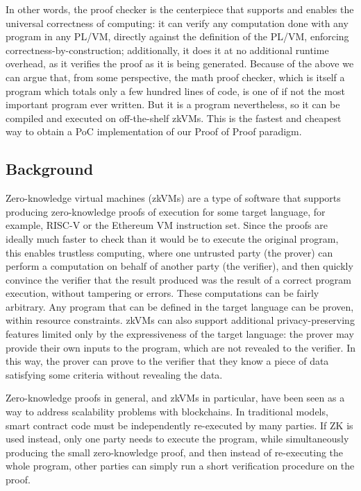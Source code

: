 \documentclass{article}
\theoremstyle{plain}
\theoremstyle{definition}
\begin{document}
In other words, the proof checker is the centerpiece that supports and enables the universal correctness of computing: it can verify any computation done with any program in any PL/VM, directly against the definition of the PL/VM, enforcing correctness-by-construction; additionally, it does it at no additional runtime overhead, as it verifies the proof as it is being generated.  Because of the above we can argue that, from some perspective, the math proof checker, which is itself a program which totals only a few hundred lines of code, is one of if not the most important program ever written.  But it is a program nevertheless, so it can be compiled and executed on off-the-shelf zkVMs. This is the fastest and cheapest way to obtain a PoC implementation of our Proof of Proof paradigm.

\subsection{Background}

Zero-knowledge virtual machines (zkVMs) are a type of software that supports producing zero-knowledge proofs of execution for some target language, for example, RISC-V or the Ethereum VM instruction set. Since the proofs are ideally much faster to check than it would be to execute the original program, this enables trustless computing, where one untrusted party (the prover) can perform a computation on behalf of another party (the verifier), and then quickly convince the verifier that the result produced was the result of a correct program execution, without tampering or errors. These computations can be fairly arbitrary. Any program that can be defined in the target language can be proven, within resource constraints. zkVMs can also support additional privacy-preserving features limited only by the expressiveness of the target language: the prover may provide their own inputs to the program, which are not revealed to the verifier. In this way, the prover can prove to the verifier that they know a piece of data satisfying some criteria without revealing the data. 

Zero-knowledge proofs in general, and zkVMs in particular, have been seen as a way to address scalability problems with blockchains. In traditional models, smart contract code must be independently re-executed by many parties. If ZK is used instead, only one party needs to execute the program, while simultaneously producing the small zero-knowledge proof, and then instead of re-executing the whole program, other parties can simply run a short verification procedure on the proof.
\end{document}
